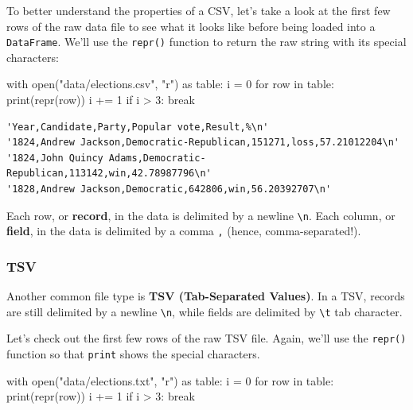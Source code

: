 \documentclass[
  letterpaper,
  DIV=11,
  numbers=noendperiod]{scrreprt}
\newenvironment{Shaded}{\begin{snugshade}}{\end{snugshade}}
\newcommand{\BuiltInTok}[1]{\textcolor[rgb]{0.00,0.23,0.31}{#1}}
\newcommand{\ControlFlowTok}[1]{\textcolor[rgb]{0.00,0.23,0.31}{#1}}
\newcommand{\DecValTok}[1]{\textcolor[rgb]{0.68,0.00,0.00}{#1}}
\newcommand{\ImportTok}[1]{\textcolor[rgb]{0.00,0.46,0.62}{#1}}
\newcommand{\KeywordTok}[1]{\textcolor[rgb]{0.00,0.23,0.31}{#1}}
\newcommand{\NormalTok}[1]{\textcolor[rgb]{0.00,0.23,0.31}{#1}}
\newcommand{\OperatorTok}[1]{\textcolor[rgb]{0.37,0.37,0.37}{#1}}
\newcommand{\StringTok}[1]{\textcolor[rgb]{0.13,0.47,0.30}{#1}}
\begin{document}
To better understand the properties of a CSV, let's take a look at the
first few rows of the raw data file to see what it looks like before
being loaded into a \texttt{DataFrame}. We'll use the \texttt{repr()}
function to return the raw string with its special characters:

\begin{Shaded}
\begin{Highlighting}[]
\ControlFlowTok{with} \BuiltInTok{open}\NormalTok{(}\StringTok{"data/elections.csv"}\NormalTok{, }\StringTok{"r"}\NormalTok{) }\ImportTok{as}\NormalTok{ table:}
\NormalTok{    i }\OperatorTok{=} \DecValTok{0}
    \ControlFlowTok{for}\NormalTok{ row }\KeywordTok{in}\NormalTok{ table:}
        \BuiltInTok{print}\NormalTok{(}\BuiltInTok{repr}\NormalTok{(row))}
\NormalTok{        i }\OperatorTok{+=} \DecValTok{1}
        \ControlFlowTok{if}\NormalTok{ i }\OperatorTok{\textgreater{}} \DecValTok{3}\NormalTok{:}
            \ControlFlowTok{break}
\end{Highlighting}
\end{Shaded}

\begin{verbatim}
'Year,Candidate,Party,Popular vote,Result,%\n'
'1824,Andrew Jackson,Democratic-Republican,151271,loss,57.21012204\n'
'1824,John Quincy Adams,Democratic-Republican,113142,win,42.78987796\n'
'1828,Andrew Jackson,Democratic,642806,win,56.20392707\n'
\end{verbatim}

Each row, or \textbf{record}, in the data is delimited by a newline
\texttt{\textbackslash{}n}. Each column, or \textbf{field}, in the data
is delimited by a comma \texttt{,} (hence, comma-separated!).

\hypertarget{tsv}{%
\subsubsection{TSV}\label{tsv}}

Another common file type is \textbf{TSV (Tab-Separated Values)}. In a
TSV, records are still delimited by a newline
\texttt{\textbackslash{}n}, while fields are delimited by
\texttt{\textbackslash{}t} tab character.

Let's check out the first few rows of the raw TSV file. Again, we'll use
the \texttt{repr()} function so that \texttt{print} shows the special
characters.

\begin{Shaded}
\begin{Highlighting}[]
\ControlFlowTok{with} \BuiltInTok{open}\NormalTok{(}\StringTok{"data/elections.txt"}\NormalTok{, }\StringTok{"r"}\NormalTok{) }\ImportTok{as}\NormalTok{ table:}
\NormalTok{    i }\OperatorTok{=} \DecValTok{0}
    \ControlFlowTok{for}\NormalTok{ row }\KeywordTok{in}\NormalTok{ table:}
        \BuiltInTok{print}\NormalTok{(}\BuiltInTok{repr}\NormalTok{(row))}
\NormalTok{        i }\OperatorTok{+=} \DecValTok{1}
        \ControlFlowTok{if}\NormalTok{ i }\OperatorTok{\textgreater{}} \DecValTok{3}\NormalTok{:}
            \ControlFlowTok{break}
\end{Highlighting}
\end{Shaded}
\end{document}
